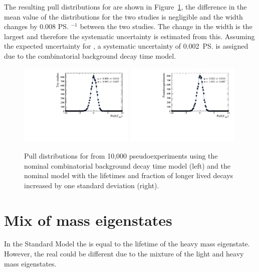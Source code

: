 The resulting pull distributions for \Gmumu are shown in Figure~\ref{fig:CBGextreme}, the difference in the mean value of the distributions for the two studies is negligible and the width changes by 0.008 \ps$^{-1}$ between the two studies. The change in the width is the largest and therefore the systematic uncertainty is estimated from this. Assuming the expected uncertainty for \tmumu, a systematic uncertainty of 0.002~\ps is assigned due to the combinatorial background decay time model.

\begin{figure}[tbp]
  \centering
    \includegraphics[width=0.49\textwidth]{./Figs/LifetimeSystematics/Gamma_pull_mass_pdf_Run1.pdf}
    \includegraphics[width=0.49\textwidth]{./Figs/LifetimeSystematics/Bs2MuMu_gamma_pull_CKM_extremeCBG_DT.pdf}
  \caption{Pull distributions for \Gmumu from 10,000 pseudoexperiments using the nominal combinatorial background decay time model (left) and the nominal model with the lifetimes and fraction of longer lived decays increased by one standard deviation (right).}
  \label{fig:CBGextreme}
\end{figure}


\section[Mix of \bs mass eigenstates]{Mix of \boldmath{\bs} mass eigenstates}
\label{sec:mixofeigenstates}

In the Standard Model the \bsmumu \el is equal to the lifetime of the heavy \bs mass eigenstate. However, the real \bsmumu \el could be different due to the mixture of the light and heavy mass eigenstates. %

